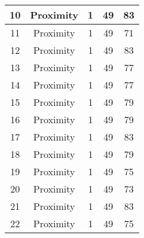 \documentclass[results.tex]{subfiles}
\begin{document}
\begin{center}
\begin{tabular}{| c || c | c | c | c |}
            \hline
            10                      & Proximity                    & 1                      & 49                      & 83                   \\
            \hline
            11                      & Proximity                    & 1                      & 49                      & 71                   \\
            \hline
            12                      & Proximity                    & 1                      & 49                      & 83                   \\
            \hline
            13                      & Proximity                    & 1                      & 49                      & 77                   \\
            \hline
            14                      & Proximity                    & 1                      & 49                      & 77                   \\
            \hline
            15                      & Proximity                    & 1                      & 49                      & 79                   \\
            \hline
            16                      & Proximity                    & 1                      & 49                      & 79                   \\
            \hline
            17                      & Proximity                    & 1                      & 49                      & 83                   \\
            \hline
            18                      & Proximity                    & 1                      & 49                      & 79                   \\
            \hline
            19                      & Proximity                    & 1                      & 49                      & 75                   \\
            \hline
            20                      & Proximity                    & 1                      & 49                      & 73                   \\
            \hline
            21                      & Proximity                    & 1                      & 49                      & 83                   \\
            \hline
            22                      & Proximity                    & 1                      & 49                      & 75                   \\

\end{tabular}
\end{center}
\end{document}

